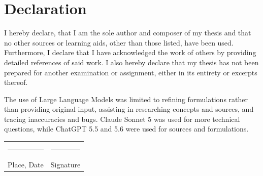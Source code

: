 
\chapter*{Declaration}

I hereby declare, that I am the sole author and composer of my thesis and that no other sources or learning aids, other than those listed, have been used. Furthermore, I declare that I have acknowledged the work of others by providing detailed references of said work.  \newline
I also hereby declare that my thesis has not been prepared for another examination
or assignment, either in its entirety or excerpts thereof.

The use of Large Language Models was limited to refining formulations rather than providing original input, assisting in researching concepts and sources, and tracing inaccuracies and bugs. Claude Sonnet 5 was used for more technical questions, while ChatGPT 5.5 and 5.6 were used for sources and formulations.
\\[3\normalbaselineskip]
\begin{tabular}{p{} l}
  \rule{\textwidth/3}{0.4pt}   &   \rule{\textwidth/3}{0.4pt} \\
  Place, Date                  &   Signature
\end{tabular}
